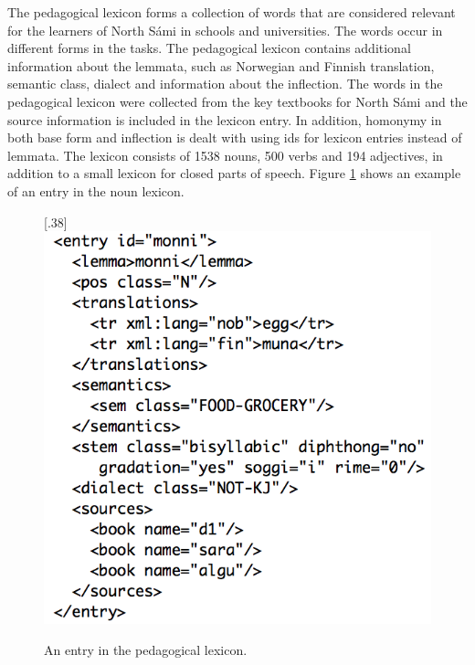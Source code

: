\documentclass[11pt]{article}
\begin{document}


The pedagogical lexicon forms a collection of words that are considered relevant for the learners of North Sámi in schools and universities. The words occur in different forms in the tasks. The pedagogical lexicon contains additional information about the lemmata, such as Norwegian and Finnish translation, semantic class, dialect and information about the inflection. The words in the pedagogical lexicon were collected from the key textbooks for North Sámi and the source information is included in the lexicon entry. 
In addition, homonymy in both base form and inflection is dealt with using ids for lexicon entries instead of lemmata.  The lexicon consists of 1538 nouns, 500 verbs and 194 adjectives, in addition to a small lexicon for closed parts of speech. Figure \ref{nounlex} shows an example of an entry in the noun lexicon.

\begin{figure}[tbp]
\begin{center}
\scalebox{.38}[.38]{\includegraphics{presentation/img/nounlexicon4.png}}\\
\caption{An entry in the pedagogical lexicon.}
\label{nounlex}
\end{center}
\end{figure}
\end{document}
